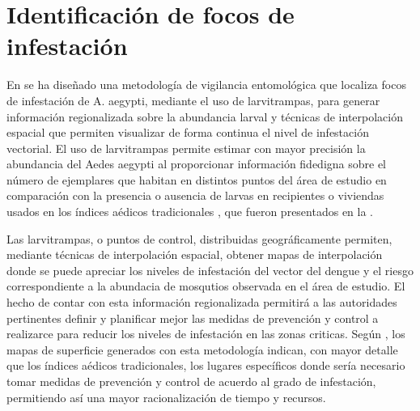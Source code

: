 \section{Identificación de focos de infestación}
\label{sec:cap4-identificacion-focos}

En \citet{NINO2011} se ha diseñado una metodología de vigilancia entomológica que localiza focos
de infestación de A. aegypti, mediante el uso de larvitrampas, para generar información
regionalizada sobre la abundancia larval y técnicas de interpolación espacial que permiten
visualizar de forma continua el nivel de infestación vectorial. El uso de larvitrampas permite
estimar con mayor precisión la abundancia del Aedes aegypti al proporcionar información fidedigna
sobre el número de ejemplares que habitan en distintos puntos del área de estudio en comparación
con la presencia o ausencia de larvas en recipientes o viviendas usados en los índices aédicos
tradicionales \citet{NINO2011}, que fueron presentados en la
.

Las larvitrampas, o puntos de control, distribuidas geográficamente permiten, mediante técnicas de
interpolación espacial, obtener mapas de interpolación donde se puede apreciar los niveles de
infestación del vector del dengue y el riesgo correspondiente a la abundacia de mosqutios
observada en el área de estudio. El hecho de contar con esta información regionalizada permitirá
a las autoridades pertinentes definir y planificar mejor las medidas de prevención y control a
realizarce para reducir los niveles de infestación en las zonas criticas. Según \citet{NINO2011},
los mapas de superficie generados con esta metodología indican, con mayor detalle que los índices
aédicos tradicionales, los lugares específicos donde sería necesario tomar medidas de prevención y
control de acuerdo al grado de infestación, permitiendo así una mayor racionalización de tiempo y
recursos.
